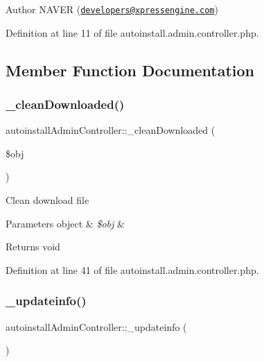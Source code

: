 \begin{DoxyAuthor}{Author}
N\+A\+V\+ER (\href{mailto:developers@xpressengine.com}{\tt developers@xpressengine.\+com}) 
\end{DoxyAuthor}


Definition at line 11 of file autoinstall.\+admin.\+controller.\+php.



\subsection{Member Function Documentation}
\mbox{\label{classautoinstallAdminController_af921268532a99f4a86c9979212279262}} 
\subsubsection{\texorpdfstring{\+\_\+clean\+Downloaded()}{\_cleanDownloaded()}}
{\footnotesize\ttfamily autoinstall\+Admin\+Controller\+::\+\_\+clean\+Downloaded (\begin{DoxyParamCaption}\item[{}]{\$obj }\end{DoxyParamCaption})}

Clean download file


\begin{DoxyParams}[1]{Parameters}
object & {\em \$obj} & \\
\hline
\end{DoxyParams}
\begin{DoxyReturn}{Returns}
void 
\end{DoxyReturn}


Definition at line 41 of file autoinstall.\+admin.\+controller.\+php.

\mbox{\label{classautoinstallAdminController_ad25ac25ebf81de31754b454b758e7d20}} 
\subsubsection{\texorpdfstring{\+\_\+updateinfo()}{\_updateinfo()}}
{\footnotesize\ttfamily autoinstall\+Admin\+Controller\+::\+\_\+updateinfo (\begin{DoxyParamCaption}{ }\end{DoxyParamCaption})}


